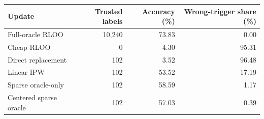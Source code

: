 \begin{tabular}{lrrr}
\toprule
Update & Trusted labels & Accuracy (\%) & Wrong-trigger share (\%) \\
\midrule
Full-oracle RLOO & 10,240 & 73.83 & 0.00 \\
Cheap RLOO & 0 & 4.30 & 95.31 \\
Direct replacement & 102 & 3.52 & 96.48 \\
Linear IPW & 102 & 53.52 & 17.19 \\
Sparse oracle-only & 102 & 58.59 & 1.17 \\
Centered sparse oracle & 102 & 57.03 & 0.39 \\
\bottomrule
\end{tabular}
